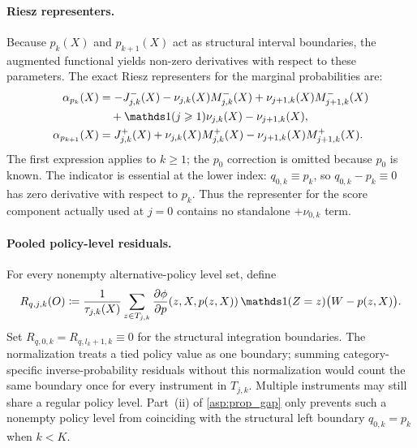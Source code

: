 \paragraph{Riesz representers.} Because $p_k(X)$ and $p_{k+1}(X)$ act as structural interval boundaries, the augmented functional yields non-zero derivatives with respect to these parameters. The exact Riesz representers for the marginal probabilities are:
\begin{align*}
    \alpha_{p_k}(X) &= -J_{j,k}^-(X) - \nu_{j,k}(X)M_{j,k}^-(X) + \nu_{j+1,k}(X)M_{j+1,k}^-(X) \\
    &\quad + \indicator(j\geqslant1)\nu_{j,k}(X) - \nu_{j+1,k}(X), \\
    \alpha_{p_{k+1}}(X) &= J_{j,k}^+(X) + \nu_{j,k}(X)M_{j,k}^+(X) - \nu_{j+1,k}(X)M_{j+1,k}^+(X).
\end{align*}
The first expression applies to $k\geqslant1$; the $p_0$ correction is omitted because $p_0$ is known. The indicator is essential at the lower index: $q_{0,k}\equiv p_k$, so $q_{0,k}-p_k\equiv0$ has zero derivative with respect to $p_k$. Thus the representer for the score component actually used at $j=0$ contains no standalone $+\nu_{0,k}$ term.

\paragraph{Pooled policy-level residuals.} For every nonempty alternative-policy level set, define
\begin{equation*}
    R_{q,j,k}(O)
    \coloneqq
    \frac{1}{\tau_{j,k}(X)}
    \sum_{z\in T_{j,k}}
    \frac{\partial\phi}{\partial p}(z,X,p(z,X))\,
    \indicator(Z=z)\bigl(W-p(z,X)\bigr).
\end{equation*}
Set $R_{q,0,k}=R_{q,l_k+1,k}\equiv0$ for the structural integration boundaries. The normalization treats a tied policy value as one boundary; summing category-specific inverse-probability residuals without this normalization would count the same boundary once for every instrument in $T_{j,k}$. Multiple instruments may still share a regular policy level. Part~\textup{(ii)} of \cref{asp:prop_gap} only prevents such a nonempty policy level from coinciding with the structural left boundary $q_{0,k}=p_k$ when $k<K$.

